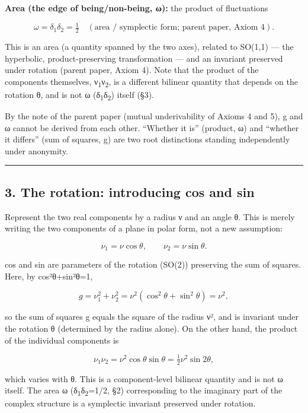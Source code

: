 \documentclass[11pt]{ltjsarticle}
\begin{document}
\textbf{Area (the edge of being/non-being, ω):} the product of
fluctuations

\[\omega = \delta_1\delta_2 = \tfrac{1}{2} \quad(\text{area / symplectic form; parent paper, Axiom 4}).\]

This is an area (a quantity spanned by the two axes), related to SO(1,1)
--- the hyperbolic, product-preserving transformation --- and an
invariant preserved under rotation (parent paper, Axiom 4). Note that
the product of the components themselves, ν\textsubscript{1}ν\textsubscript{2}, is a different bilinear
quantity that depends on the rotation θ, and is not ω (δ\textsubscript{1}δ\textsubscript{2}) itself
(§3).

By the note of the parent paper (mutual underivability of Axioms 4 and
5), g and ω cannot be derived from each other. ``Whether it is''
(product, ω) and ``whether it differs'' (sum of squares, g) are two root
distinctions standing independently under anonymity.

\begin{center}\rule{0.5\linewidth}{0.5pt}\end{center}

\subsection{3. The rotation: introducing cos and
sin}\label{the-rotation-introducing-cos-and-sin}

Represent the two real components by a radius ν and an angle θ. This is
merely writing the two components of a plane in polar form, not a new
assumption:

\[\nu_1 = \nu\cos\theta, \qquad \nu_2 = \nu\sin\theta.\]

cos and sin are parameters of the rotation (SO(2)) preserving the sum of
squares. Here, by cos²θ+sin²θ=1,

\[g = \nu_1^2 + \nu_2^2 = \nu^2(\cos^2\theta + \sin^2\theta) = \nu^2,\]

so the sum of squares g equals the square of the radius ν², and is
invariant under the rotation θ (determined by the radius alone). On the
other hand, the product of the individual components is

\[\nu_1\nu_2 = \nu^2\cos\theta\sin\theta = \tfrac{1}{2}\nu^2\sin 2\theta,\]

which varies with θ. This is a component-level bilinear quantity and is
not ω itself. The area ω (δ\textsubscript{1}δ\textsubscript{2}=1/2, §2) corresponding to the imaginary
part of the complex structure is a symplectic invariant preserved under
rotation.
\end{document}
